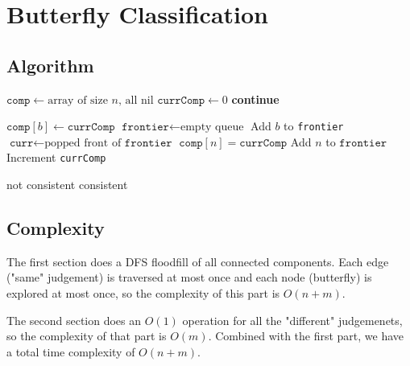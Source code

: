 \documentclass[12pt]{article}
\begin{document}
\section{Butterfly Classification}

\subsection*{Algorithm}

\begin{algorithmic}[1]
    \State $\texttt{comp} \gets \text{array of size }n\text{, all nil}$
    \State $\texttt{currComp} \gets 0$
            \State \textbf{continue}
        \EndIf

        \item[]
        \State $\texttt{comp}[b] \gets \texttt{currComp}$
        \State $\texttt{frontier} \gets \text{empty queue}$
        \State Add $b$ to \texttt{frontier}
            \State $\texttt{curr} \gets \text{popped front of }\texttt{frontier}$
                    \State $\texttt{comp}[n] = \texttt{currComp}$
                    \State Add $n$ to $\texttt{frontier}$
                \EndIf
            \EndFor
        \EndWhile
        \State Increment \texttt{currComp}
    \EndFor

    \item[]
                \State \Return not consistent
            \EndIf
        \EndFor
    \EndFor
    \State \Return consistent
\end{algorithmic}

\subsection*{Complexity}

The first section does a DFS floodfill of all connected components.
Each edge ("same" judgement) is traversed at most once and each node (butterfly)
is explored at most once, so the complexity of this part is $O(n+m)$.

The second section does an $O(1)$ operation for all the "different" judgemenets,
so the complexity of that part is $O(m)$.
Combined with the first part, we have a total time complexity of $O(n+m)$.
\end{document}
